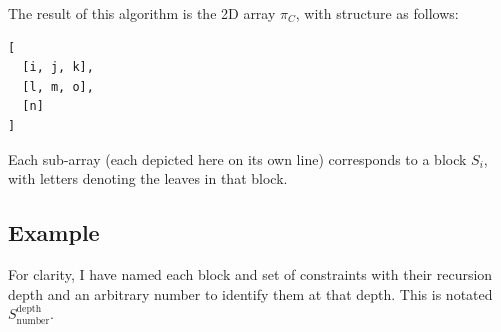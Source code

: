 \documentclass[11pt]{article} %
\renewcommand{\thesubsubsection}{}
\begin{document}
The result of this algorithm is the 2D array $\pi_C$, with structure as follows:
\begin{lstlisting}
[
  [i, j, k],
  [l, m, o],
  [n]
]
\end{lstlisting}
Each sub-array (each depicted here on its own line) corresponds to a block $S_i$, with letters denoting the leaves in that block.


\subsection{Example}
For clarity, I have named each block and set of constraints with their recursion depth and an arbitrary number to identify them at that depth. This is notated $S_\text{number}^\text{depth}$.

\setcounter{subsubsection}{-1}
\renewcommand{\thesubsubsection}{Recursion depth \arabic{subsubsection}}
\end{document}
